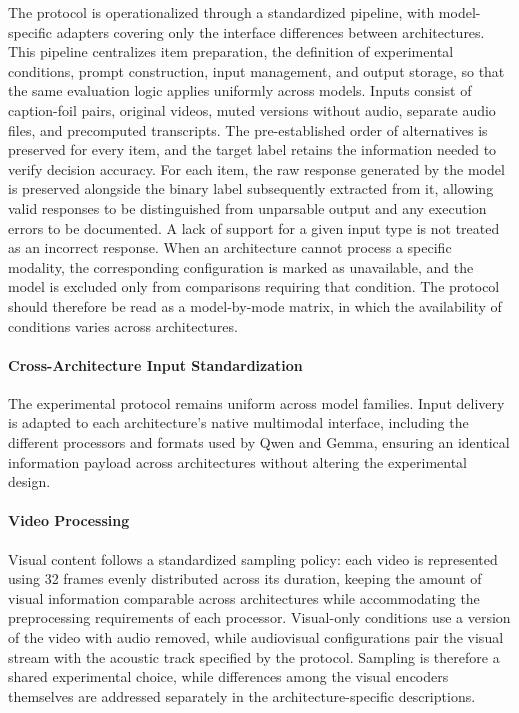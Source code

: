 The protocol is operationalized through a standardized pipeline, with model-specific adapters covering only the interface differences between architectures. This pipeline centralizes item preparation, the definition of experimental conditions, prompt construction, input management, and output storage, so that the same evaluation logic applies uniformly across models.
Inputs consist of caption-foil pairs, original videos, muted versions without audio, separate audio files, and precomputed transcripts. The pre-established order of alternatives is preserved for every item, and the target label retains the information needed to verify decision accuracy.
For each item, the raw response generated by the model is preserved alongside the binary label subsequently extracted from it, allowing valid responses to be distinguished from unparsable output and any execution errors to be documented.
A lack of support for a given input type is not treated as an incorrect response. When an architecture cannot process a specific modality, the corresponding configuration is marked as unavailable, and the model is excluded only from comparisons requiring that condition. The protocol should therefore be read as a model-by-mode matrix, in which the availability of conditions varies across architectures.
\paragraph{Cross-Architecture Input Standardization} The experimental protocol remains uniform across model families. Input delivery is adapted to each architecture's native multimodal interface, including the different processors and formats used by Qwen and Gemma, ensuring an identical information payload across architectures without altering the experimental design.
\paragraph{Video Processing} Visual content follows a standardized sampling policy: each video is represented using 32 frames evenly distributed across its duration, keeping the amount of visual information comparable across architectures while accommodating the preprocessing requirements of each processor. Visual-only conditions use a version of the video with audio removed, while audiovisual configurations pair the visual stream with the acoustic track specified by the protocol. Sampling is therefore a shared experimental choice, while differences among the visual encoders themselves are addressed separately in the architecture-specific descriptions.

